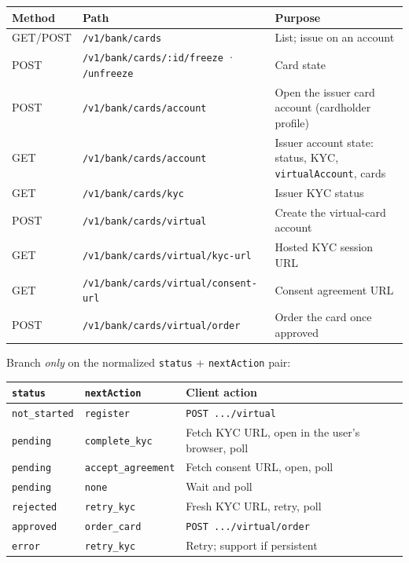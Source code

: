 \documentclass[11pt]{article}
\newcommand{\ep}[1]{\texttt{\small #1}}
\begin{document}
\begin{table}[H]
\centering
\small
\begin{tabular}{@{}llp{6.6cm}@{}}
\toprule
\textbf{Method} & \textbf{Path} & \textbf{Purpose} \\
\midrule
GET/POST & \ep{/v1/bank/cards} & List; issue on an account \\
POST & \ep{/v1/bank/cards/:id/freeze} · \ep{/unfreeze} & Card state \\
POST & \ep{/v1/bank/cards/account} & Open the issuer card account (cardholder profile) \\
GET & \ep{/v1/bank/cards/account} & Issuer account state: status, KYC, \ep{virtualAccount}, cards \\
GET & \ep{/v1/bank/cards/kyc} & Issuer KYC status \\
POST & \ep{/v1/bank/cards/virtual} & Create the virtual-card account \\
GET & \ep{/v1/bank/cards/virtual/kyc-url} & Hosted KYC session URL \\
GET & \ep{/v1/bank/cards/virtual/consent-url} & Consent agreement URL \\
POST & \ep{/v1/bank/cards/virtual/order} & Order the card once approved \\
\bottomrule
\end{tabular}
\end{table}

Branch \emph{only} on the normalized \ep{status} + \ep{nextAction}
pair:

\begin{table}[H]
\centering
\small
\begin{tabular}{@{}llp{6.8cm}@{}}
\toprule
\ep{status} & \ep{nextAction} & \textbf{Client action} \\
\midrule
\ep{not\_started} & \ep{register} & \ep{POST .../virtual} \\
\ep{pending} & \ep{complete\_kyc} & Fetch KYC URL, open in the user's browser, poll \\
\ep{pending} & \ep{accept\_agreement} & Fetch consent URL, open, poll \\
\ep{pending} & \ep{none} & Wait and poll \\
\ep{rejected} & \ep{retry\_kyc} & Fresh KYC URL, retry, poll \\
\ep{approved} & \ep{order\_card} & \ep{POST .../virtual/order} \\
\ep{error} & \ep{retry\_kyc} & Retry; support if persistent \\
\bottomrule
\end{tabular}
\end{table}
\end{document}
